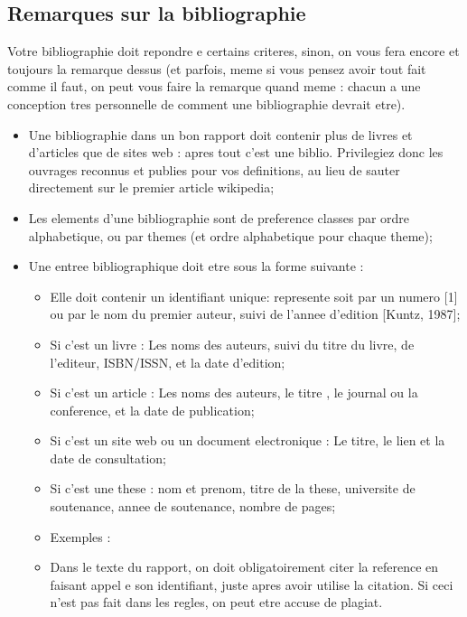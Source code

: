 \begin{spacing}{1.2}
\section{Remarques sur la bibliographie}
Votre bibliographie doit repondre e certains criteres, sinon, on vous fera encore et
toujours la remarque dessus (et parfois, meme si vous pensez avoir tout fait comme il
 faut, on peut vous faire la remarque quand meme : chacun a une conception tres
personnelle de comment une bibliographie devrait etre).\\
\begin{itemize}
\item Une bibliographie dans un bon rapport doit contenir plus de livres et d'articles 
que de sites web : apres tout c'est une biblio. Privilegiez donc les ouvrages
reconnus et publies pour vos definitions, au lieu de sauter directement sur le premier article wikipedia;
 \item Les elements d'une bibliographie sont de preference classes par ordre
alphabetique, ou par themes (et ordre alphabetique pour chaque theme);
\item Une entree bibliographique doit etre sous la forme suivante :
\begin{itemize}
\item Elle doit contenir un identifiant unique: represente soit par un numero
[1] ou par le nom du premier auteur, suivi de l'annee d'edition [Kuntz, 1987];
\item Si c'est un livre : Les noms des auteurs, suivi du titre du livre, de l'editeur, 
ISBN/ISSN, et la date d'edition;
\item Si c'est un article : Les noms des auteurs, le titre , le journal ou la
conference, et la date de publication;
\item Si c'est un site web ou un document electronique : Le titre, le lien et la date 
de consultation;
\item Si c'est une these : nom et prenom, titre de la these, universite de
soutenance, annee de soutenance, nombre de pages;
\item Exemples : 
\item Dans le texte du rapport, on doit obligatoirement citer la reference en  faisant appel e son identifiant, juste apres avoir utilise la citation. Si ceci n'est pas fait dans les regles, on peut etre accuse de plagiat.
\end{itemize} 
\end{itemize} 


\end{spacing}
